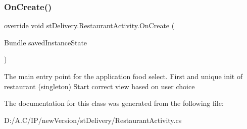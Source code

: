 \subsubsection{\texorpdfstring{On\+Create()}{OnCreate()}}
{\footnotesize\ttfamily override void st\+Delivery.\+Restaurant\+Activity.\+On\+Create (\begin{DoxyParamCaption}\item[{Bundle}]{saved\+Instance\+State }\end{DoxyParamCaption})\hspace{0.3cm}{\ttfamily [protected]}}



The main entry point for the application food select. First and unique init of restaurant (singleton) Start correct view based on user choice 



The documentation for this class was generated from the following file\+:\begin{DoxyCompactItemize}
\item 
D\+:/\+A.\+C/\+I\+P/new\+Version/st\+Delivery/Restaurant\+Activity.\+cs\end{DoxyCompactItemize}
